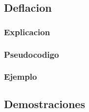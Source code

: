 \subsection{Deflacion}
\subsubsection{Explicacion}

\subsubsection{Pseudocodigo}

\subsubsection{Ejemplo}


\subsection{Demostraciones}

